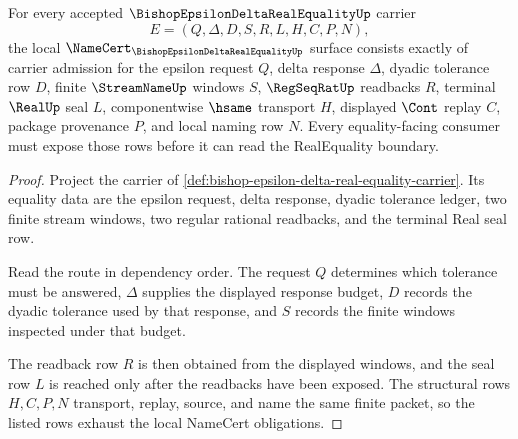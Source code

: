 \begin{theorem}
\label{thm:bishop-epsilon-delta-real-equality-namecert-obligations}
For every accepted $\BishopEpsilonDeltaRealEqualityUp$ carrier
$$
E=(Q,\Delta,D,S,R,L,H,C,P,N),
$$
the local $\NameCert_{\BishopEpsilonDeltaRealEqualityUp}$ surface consists exactly of carrier admission for the epsilon request $Q$, delta response $\Delta$, dyadic tolerance row $D$, finite $\StreamNameUp$ windows $S$, $\RegSeqRatUp$ readbacks $R$, terminal $\RealUp$ seal $L$, componentwise $\hsame$ transport $H$, displayed $\Cont$ replay $C$, package provenance $P$, and local naming row $N$. Every equality-facing consumer must expose those rows before it can read the RealEquality boundary.
\end{theorem}
\begin{proof}
Project the carrier of \autoref{def:bishop-epsilon-delta-real-equality-carrier}. Its equality data are the epsilon request, delta response, dyadic tolerance ledger, two finite stream windows, two regular rational readbacks, and the terminal Real seal row.

Read the route in dependency order. The request $Q$ determines which tolerance must be answered, $\Delta$ supplies the displayed response budget, $D$ records the dyadic tolerance used by that response, and $S$ records the finite windows inspected under that budget.

The readback row $R$ is then obtained from the displayed windows, and the seal row $L$ is reached only after the readbacks have been exposed. The structural rows $H,C,P,N$ transport, replay, source, and name the same finite packet, so the listed rows exhaust the local NameCert obligations.
\end{proof}

